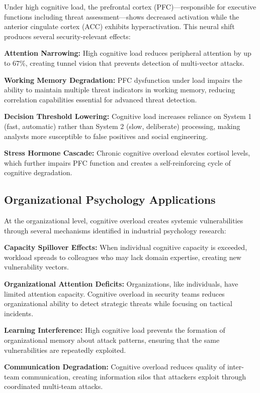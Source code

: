 \documentclass[11pt,a4paper]{article}
\begin{document}
Under high cognitive load, the prefrontal cortex (PFC)---responsible for executive functions including threat assessment---shows decreased activation while the anterior cingulate cortex (ACC) exhibits hyperactivation\cite{arnsten2009}. This neural shift produces several security-relevant effects:

\textbf{Attention Narrowing:} High cognitive load reduces peripheral attention by up to 67\%\cite{lavie2005}, creating tunnel vision that prevents detection of multi-vector attacks.

\textbf{Working Memory Degradation:} PFC dysfunction under load impairs the ability to maintain multiple threat indicators in working memory, reducing correlation capabilities essential for advanced threat detection.

\textbf{Decision Threshold Lowering:} Cognitive load increases reliance on System 1 (fast, automatic) rather than System 2 (slow, deliberate) processing\cite{kahneman2011}, making analysts more susceptible to false positives and social engineering.

\textbf{Stress Hormone Cascade:} Chronic cognitive overload elevates cortisol levels, which further impairs PFC function and creates a self-reinforcing cycle of cognitive degradation\cite{arnsten2009}.

\subsection{Organizational Psychology Applications}

At the organizational level, cognitive overload creates systemic vulnerabilities through several mechanisms identified in industrial psychology research:

\textbf{Capacity Spillover Effects:} When individual cognitive capacity is exceeded, workload spreads to colleagues who may lack domain expertise, creating new vulnerability vectors\cite{basketball2018}.

\textbf{Organizational Attention Deficits:} Organizations, like individuals, have limited attention capacity\cite{ocasio1997}. Cognitive overload in security teams reduces organizational ability to detect strategic threats while focusing on tactical incidents.

\textbf{Learning Interference:} High cognitive load prevents the formation of organizational memory about attack patterns, ensuring that the same vulnerabilities are repeatedly exploited\cite{cyert1963}.

\textbf{Communication Degradation:} Cognitive overload reduces quality of inter-team communication, creating information silos that attackers exploit through coordinated multi-team attacks\cite{shannon1948}.
\end{document}
